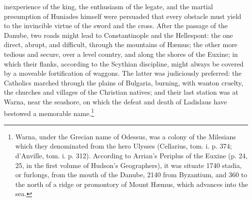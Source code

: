 inexperience of the king, the enthusiasm of the legate, and the martial presumption of Huniades himself were persuaded that every obstacle must yield to the invincible virtue of the sword and the cross. After the passage of the Danube, two roads might lead to Constantinople and the Hellespont: the one direct, abrupt, and difficult, through the mountains of Hæmus; the other more tedious and secure, over a level country, and along the shores of the Euxine; in which their flanks, according to the Scythian discipline, might always be covered by a moveable fortification of waggons. The latter was judiciously preferred: the Catholics marched through the plains of Bulgaria, burning, with wanton cruelty, the churches and villages of the Christian natives; and their last station was at Warna, near the seashore, on which the defeat and death of Ladislaus have bestowed a memorable name.\footnote{Warna, under the Grecian name of Odessus, was a colony of the Milesians which they denominated from the hero Ulysses (Cellarius, tom. i. p. 374; d\texthebrew{}’Anville, tom. i. p. 312). According to Arrian\texthebrew{}’s Periplus of the Euxine (p. 24, 25, in the first volume of Hudson\texthebrew{}’s Geographers), it was situate 1740 stadia, or furlongs, from the mouth of the Danube, 2140 from Byzantium, and 360 to the north of a ridge or promontory of Mount Hæmus, which advances into the sea.}


